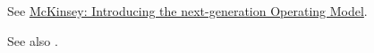 %
%
See \href{https://www.mckinsey.com/~/media/mckinsey/business%20functions/mckinsey%20digital/our%20insights/introducing%20the%20next-generation%20operating%20model/introducing-the-next-gen-operating-model.ashx}{McKinsey: Introducing the next-generation Operating Model}.

See also .
